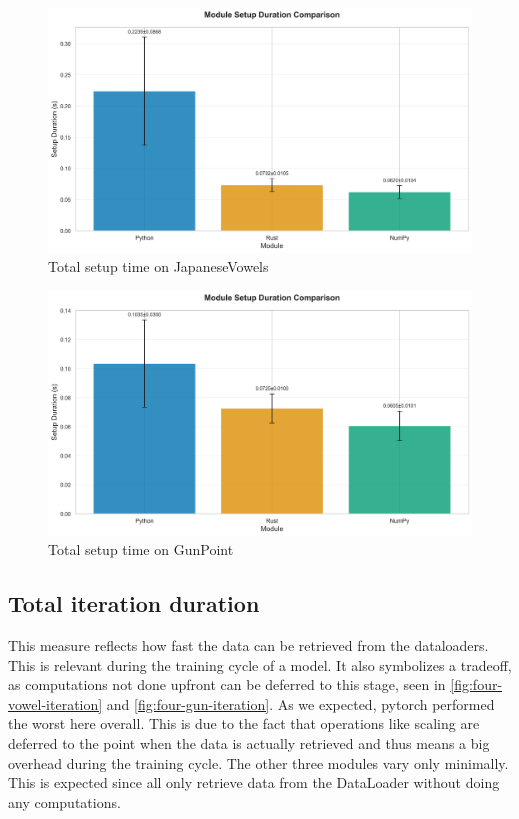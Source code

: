 \documentclass[review]{AIM_report}
\begin{document}
\begin{figure}[H]
    \centering
    \includegraphics[width=\figsize\textwidth]{files/benchmarking/setup/three/vowel.png}
    \caption{Total setup time on JapaneseVowels}
    \label{fig:three-vowel-setup}
\end{figure}
\begin{figure}[H]
    \centering
    \includegraphics[width=\figsize\textwidth]{files/benchmarking/setup/three/gun.png}
    \caption{Total setup time on GunPoint}
    \label{fig:three-gun-setup}
\end{figure}

\subsection{Total iteration duration}
This measure reflects how fast the data can be retrieved from the dataloaders. This is relevant during the training cycle of a model. It also symbolizes a tradeoff, as computations not done upfront can be deferred to this stage, seen in \autoref{fig:four-vowel-iteration} and \autoref{fig:four-gun-iteration}. As we expected, pytorch performed the worst here overall. This is due to the fact that operations like scaling are deferred to the point when the data is actually retrieved and thus means a big overhead during the training cycle. The other three modules vary only minimally. This is expected since all only retrieve data from the DataLoader without doing any computations.
\end{document}
